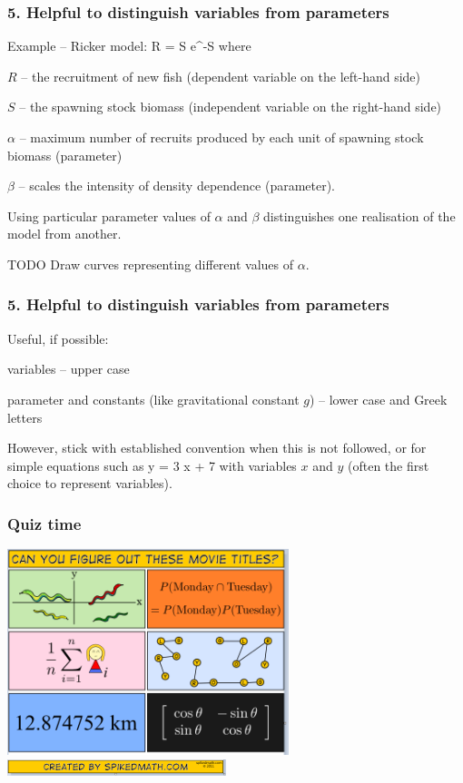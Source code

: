 \begin{frame}
\frametitle{5. Helpful to distinguish variables from parameters}

Example -- Ricker model:
\eb
\nonumber R = \alpha S \mbox{e}^{-\beta S}
\label{ricker}
\ee
where
\bi
  \item $R$ -- the recruitment of new fish (dependent variable on the left-hand
    side)
  \item $S$ -- the spawning stock biomass (independent variable on the right-hand
    side)
  \item $\alpha$ -- maximum number of recruits produced by each unit
  of spawning stock biomass (parameter)
  \item $\beta$ -- scales the intensity of density dependence (parameter).
\ei

Using particular parameter values of $\alpha$ and $\beta$ distinguishes one
realisation of the model from another.

TODO Draw curves representing different values of $\alpha$.

\end{frame}


\begin{frame}
\frametitle{5. Helpful to distinguish variables from parameters}

Useful, if possible:
\bi
 \item variables -- upper case
 \item parameter and constants (like gravitational constant $g$) -- lower case
   and Greek letters
\ei

However, stick with established convention when this is not followed, or for
simple equations such as
\eb
\nonumber y = 3 x + 7
\ee
with variables $x$ and $y$ (often the first choice to represent variables).

\end{frame}


\begin{frame}
\frametitle{Quiz time}

\centering
\includegraphics[height=6cm]{images/movies2.png}\\
\includegraphics[height=0.5cm]{images/movies-credit.png}

\end{frame}

